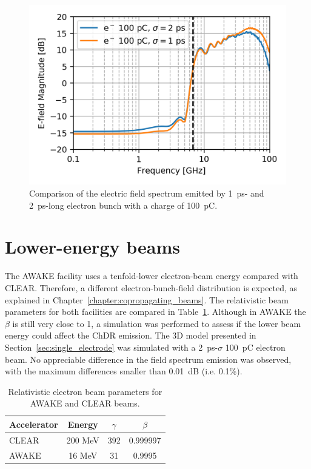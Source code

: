 \begin{figure}[!h]
\centering
\includegraphics[scale=1, keepaspectratio]{pictures/1ps-vs-2ps}
\caption{Comparison of the electric field spectrum emitted by 1~ps- and 2~ps-long electron bunch with a charge of 100~pC. }
\label{fig:1ps-vs-2}
\end{figure}




\section[Lower-energy beams]{Lower-energy beams}

The AWAKE facility uses a tenfold-lower electron-beam energy compared with CLEAR. Therefore, a different electron-bunch-field distribution is expected, as explained in Chapter~\ref{chapter:copropagating_beams}. The relativistic beam parameters for both facilities are compared in Table~\ref{tab:param_awake_vs_clear}. Although in AWAKE the $\beta$ is still very close to 1, a simulation was performed to assess if the lower beam energy could affect the ChDR emission. The 3D model presented in Section~\ref{sec:single_electrode} was simulated with a 2~ps-$\sigma$ 100~pC electron beam. No appreciable difference in the field spectrum emission was observed, with the maximum differences smaller than 0.01~dB (i.e. 0.1\%).

\begin{table}[!h]
  \centering
    \begin{tabular}{l c c c}
    \toprule
    Accelerator  & Energy & $\gamma$ & $\beta$ \\
    \midrule
    CLEAR & 200 MeV & 392 & 0.999997 \\
    AWAKE & 16 MeV  & 31  & 0.9995\\
    \bottomrule
    \end{tabular}
  \caption{Relativistic electron beam parameters for AWAKE and CLEAR beams.} \label{tab:param_awake_vs_clear}
\end{table}








